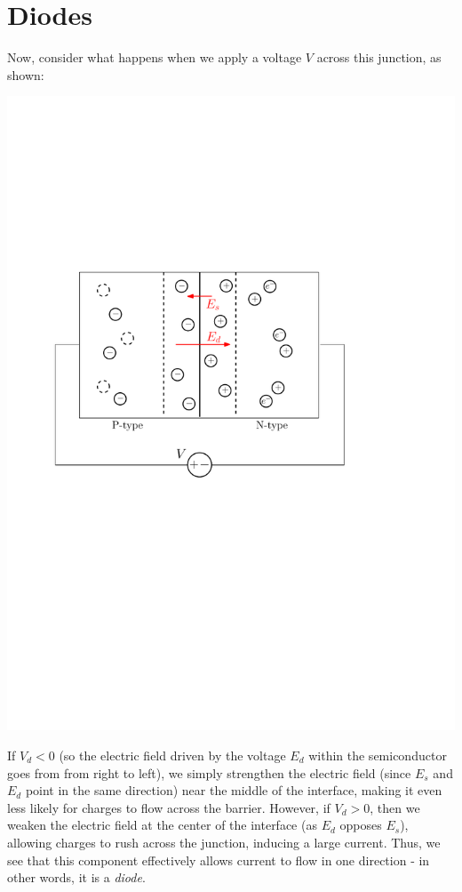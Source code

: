 \documentclass[letterpaper]{article}
\theoremstyle{remark}
\begin{document}
\section{Diodes}
Now, consider what happens when we apply a voltage $V$ across this junction, as shown:
\begin{center}
    \includegraphics[scale=0.7]{p_n_junction_3.pdf}
\end{center}

If $V_d < 0$ (so the electric field driven by the voltage $E_d$ within the semiconductor goes from from right to left), we simply strengthen the electric field (since $E_s$ and $E_d$ point in the same direction) near the middle of the interface, making it even less likely for charges to flow across the barrier. However, if $V_d > 0$, then we weaken the electric field at the center of the interface (as $E_d$ opposes $E_s$), allowing charges to rush across the junction, inducing a large current. Thus, we see that this component effectively allows current to flow in one direction - in other words, it is a \emph{diode}.
\end{document}
